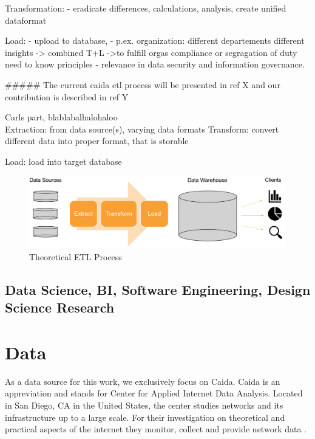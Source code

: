 \documentclass[conference, 11pt]{IEEEtran}
\begin{document}
Transformation:
- eradicate differences, calculations, analysis, create unified dataformat

Load:
- upload to database,
- p.ex. organization: different departements different insights -> combined T+L ->to fulfill orgas compliance or segragation of duty need to know principles - relevance in data security and information governance.

#####
The current caida etl process will be presented in ref X
and our contribution is described in ref Y






Carls part, blablabalhalohaloo \\ 

Extraction: from data source(s), varying data formats
Transform: convert different data into proper format, that is storable

Load: load into target database

\fi


\vspace{0.5cm}
\begin{figure}[htbp]
\centerline{\includegraphics[scale=0.3]{Graphics/ETLTheory.PNG}}
\caption{Theoretical ETL Process}
\label{fig}
\end{figure}
\vspace{0.5cm}



\subsection{Data Science, BI, Software Engineering, Design Science Research} 



\section{Data}
As a data source for this work, we exclusively focus on Caida. Caida is an appreviation and stands for Center for Applied Internet Data Analysis. Located in San Diego, CA in the United States, the center studies networks and its infrastructure up to a large scale. For their investigation on theoretical and practical aspects of the internet they monitor, collect and provide network data \cite{Caida}. 
\end{document}
